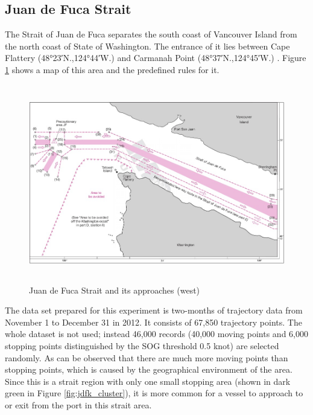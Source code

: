 \documentclass[12pt,glossary]{dalcsthesis}
\begin{document}
 
\subsection{Juan de Fuca Strait}
\label{sec:exp_1.1}
The Strait of Juan de Fuca separates the south coast of Vancouver Island from the north coast of State of Washington. The entrance of it lies between Cape Flattery (\ang{48;23;}N.,\ang{124;44;}W.) and Carmanah Point (\ang{48;37;}N.,\ang{124;45;}W.) \cite{juandefuca}. Figure \ref{fig:jdfk_pic} shows a map of this area and the predefined rules for it.

\begin{figure}[!htb]
\centering
\includegraphics[width=4.9in,height=3.4in]{jdfk_pic.png}
\caption{Juan de Fuca Strait and its approaches (west) \cite{anabook} }
\label{fig:jdfk_pic}
\end{figure}

The data set prepared for this experiment is two-months of trajectory data from November 1 to December 31 in 2012. It consists of 67,850 trajectory points. The whole dataset is not used; instead 46,000 records (40,000 moving points and 6,000 stopping points distinguished by the SOG threshold 0.5 knot) are selected randomly. As can be observed that there are much more moving points than stopping points, which is caused by the geographical environment of the area. Since this is a strait region with only one small stopping area (shown in dark green in Figure \ref{fig:jdfk_cluster}), it is more common for a vessel to approach to or exit from the port in this strait area.

\end{document}
